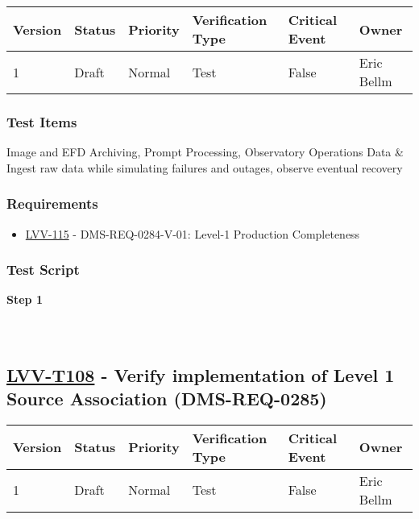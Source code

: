 \begin{longtable}[]{@{}llllll@{}}
\toprule
Version & Status & Priority & Verification Type & Critical Event &
Owner\tabularnewline
\midrule
\endhead
1 & Draft & Normal & Test & False & Eric Bellm\tabularnewline
\bottomrule
\end{longtable}

\hypertarget{test-items-7}{%
\subsubsection{Test Items}\label{test-items-7}}

Image and EFD Archiving, Prompt Processing, Observatory Operations Data
\& Ingest raw data while simulating failures and outages, observe
eventual recovery

\hypertarget{requirements-7}{%
\subsubsection{Requirements}\label{requirements-7}}

\begin{itemize}
\tightlist
\item
  \href{https://jira.lsstcorp.org/browse/LVV-115}{LVV-115} -
  DMS-REQ-0284-V-01: Level-1 Production Completeness
\end{itemize}

\hypertarget{test-script-7}{%
\subsubsection{Test Script}\label{test-script-7}}

\textbf{Step 1}\\
~\\
~\\

\hypertarget{lvv-t108---verify-implementation-of-level-1-source-association-dms-req-0285}{%
\subsection{\texorpdfstring{\href{https://jira.lsstcorp.org/secure/Tests.jspa\#/testCase/LVV-T108}{LVV-T108}
- Verify implementation of Level 1 Source Association
(DMS-REQ-0285)}{LVV-T108 - Verify implementation of Level 1 Source Association (DMS-REQ-0285)}}\label{lvv-t108---verify-implementation-of-level-1-source-association-dms-req-0285}}

\begin{longtable}[]{@{}llllll@{}}
\toprule
Version & Status & Priority & Verification Type & Critical Event &
Owner\tabularnewline
\midrule
\endhead
1 & Draft & Normal & Test & False & Eric Bellm\tabularnewline
\bottomrule
\end{longtable}

